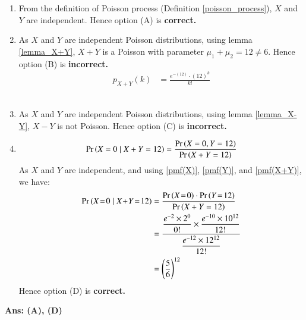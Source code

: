 \documentclass[journal,12pt,twocolumn]{IEEEtran}
\begin{document}
    
\begin{enumerate}[label=\textbf{(\Alph*)}]
    \item From the definition of Poisson process (Definition \ref{poisson_process}), $X$ and $Y$ are independent. Hence option (A) is \textbf{correct.}\\

    \item As $X$ and $Y$ are independent Poisson distributions, using lemma \eqref{lemma_X+Y}, $X+ Y$ is a Poisson with parameter $\mu_1 + \mu_2 = 12 \neq 6$. Hence option (B) is \textbf{incorrect.}
    \begin{align}
         p_{X+Y}(k) &= \frac{e^{-(12)} \cdot (12)^k}{k!}\label{pmf(X+Y)}
    \end{align}\\
    \item  As $X$ and $Y$ are independent Poisson distributions, using lemma \eqref{lemma_X-Y}, $X-Y$ is not Poisson. Hence option (C) is \textbf{incorrect.}\\

    \item \begin{align}
        \Pr\left(X=0\mid X+Y=12\right) = \dfrac{\Pr\left(X=0, Y=12\right)}{\Pr\left(X+Y=12\right)}
    \end{align}
    As $X$ and $Y$ are independent, and using \eqref{pmf(X)}, \eqref{pmf(Y)}, and \eqref{pmf(X+Y)}, we have:
    \begin{align}
        \pr{X\!=\!0\mid X\!+\!Y\!=\!12} &= \frac{\pr{X\!=\!0} \cdot \pr{Y\!=\!12}}{\pr{X+Y=12}} \\
        &= \frac{\dfrac{e^{-2}\times 2^{0}}{0!} \times \dfrac{e^{-10}\times10^{12}}{12!}}{\dfrac{e^{-12}\times12^{12}}{12!}}\\
        &= \left(\dfrac{5}{6}\right)^{12}
    \end{align}
    Hence option (D) is \textbf{correct.}
\end{enumerate}
\textbf{Ans: (A), (D)}
\end{document}
